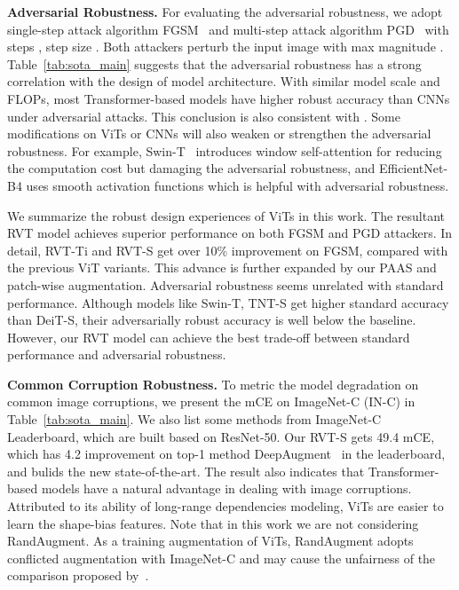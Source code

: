 \documentclass[10pt,twocolumn,letterpaper]{article}
\begin{document}
\textbf{Adversarial Robustness.} For evaluating the adversarial robustness, we adopt single-step attack algorithm FGSM~\cite{goodfellow2014explaining} and multi-step attack algorithm PGD~\cite{madry2017towards} with steps , step size . Both attackers perturb the input image with max magnitude . Table~\ref{tab:sota_main} suggests that the adversarial robustness has a strong correlation with the design of model architecture. With similar model scale and FLOPs, most Transformer-based models have higher robust accuracy than CNNs under adversarial attacks. This conclusion is also consistent with \cite{shao2021adversarial}. Some modifications on ViTs or CNNs will also weaken or strengthen the adversarial robustness. For example, Swin-T~\cite{liu2021swin} introduces window self-attention for reducing the computation cost but damaging the adversarial robustness, and EfficientNet-B4\cite{tan2019efficientnet} uses smooth activation functions which is helpful with adversarial robustness.

We summarize the robust design experiences of ViTs in this work. The resultant RVT model achieves superior performance on both FGSM and PGD attackers. In detail, RVT-Ti and RVT-S get over 10\% improvement on FGSM, compared with the previous ViT variants. This advance is further expanded by our PAAS and patch-wise augmentation. Adversarial robustness seems unrelated with standard performance. Although models like Swin-T, TNT-S get higher standard accuracy than DeiT-S, their adversarially robust accuracy is well below the baseline. However, our RVT model can achieve the best trade-off between standard performance and adversarial robustness.

\textbf{Common Corruption Robustness.}
To metric the model degradation on common image corruptions, we present the mCE on ImageNet-C (IN-C) in Table~\ref{tab:sota_main}. We also list some methods from ImageNet-C Leaderboard, which are built based on ResNet-50. Our RVT-S gets 49.4 mCE, which has 4.2 improvement on top-1 method DeepAugment~\cite{hendrycks2020many} in the leaderboard, and bulids the new state-of-the-art. The result also indicates that Transformer-based models have a natural advantage in dealing with image corruptions. Attributed to its ability of long-range dependencies modeling, ViTs are easier to learn the shape-bias features. Note that in this work we are not considering RandAugment. As a training augmentation of ViTs, RandAugment adopts conflicted augmentation with ImageNet-C and may cause the unfairness of the comparison proposed by~\cite{bai2021transformers}.
\end{document}
